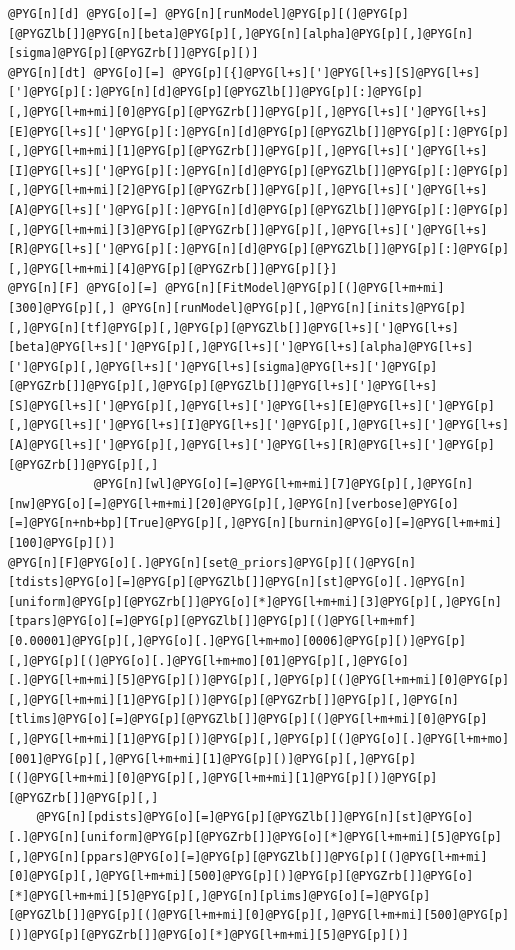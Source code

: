 \documentclass[a4paper,10pt,english]{manual}
\begin{document}
\begin{Verbatim}[commandchars=@\[\]]
@PYG[n][d] @PYG[o][=] @PYG[n][runModel]@PYG[p][(]@PYG[p][@PYGZlb[]]@PYG[n][beta]@PYG[p][,]@PYG[n][alpha]@PYG[p][,]@PYG[n][sigma]@PYG[p][@PYGZrb[]]@PYG[p][)]
@PYG[n][dt] @PYG[o][=] @PYG[p][{]@PYG[l+s][']@PYG[l+s][S]@PYG[l+s][']@PYG[p][:]@PYG[n][d]@PYG[p][@PYGZlb[]]@PYG[p][:]@PYG[p][,]@PYG[l+m+mi][0]@PYG[p][@PYGZrb[]]@PYG[p][,]@PYG[l+s][']@PYG[l+s][E]@PYG[l+s][']@PYG[p][:]@PYG[n][d]@PYG[p][@PYGZlb[]]@PYG[p][:]@PYG[p][,]@PYG[l+m+mi][1]@PYG[p][@PYGZrb[]]@PYG[p][,]@PYG[l+s][']@PYG[l+s][I]@PYG[l+s][']@PYG[p][:]@PYG[n][d]@PYG[p][@PYGZlb[]]@PYG[p][:]@PYG[p][,]@PYG[l+m+mi][2]@PYG[p][@PYGZrb[]]@PYG[p][,]@PYG[l+s][']@PYG[l+s][A]@PYG[l+s][']@PYG[p][:]@PYG[n][d]@PYG[p][@PYGZlb[]]@PYG[p][:]@PYG[p][,]@PYG[l+m+mi][3]@PYG[p][@PYGZrb[]]@PYG[p][,]@PYG[l+s][']@PYG[l+s][R]@PYG[l+s][']@PYG[p][:]@PYG[n][d]@PYG[p][@PYGZlb[]]@PYG[p][:]@PYG[p][,]@PYG[l+m+mi][4]@PYG[p][@PYGZrb[]]@PYG[p][}]
@PYG[n][F] @PYG[o][=] @PYG[n][FitModel]@PYG[p][(]@PYG[l+m+mi][300]@PYG[p][,] @PYG[n][runModel]@PYG[p][,]@PYG[n][inits]@PYG[p][,]@PYG[n][tf]@PYG[p][,]@PYG[p][@PYGZlb[]]@PYG[l+s][']@PYG[l+s][beta]@PYG[l+s][']@PYG[p][,]@PYG[l+s][']@PYG[l+s][alpha]@PYG[l+s][']@PYG[p][,]@PYG[l+s][']@PYG[l+s][sigma]@PYG[l+s][']@PYG[p][@PYGZrb[]]@PYG[p][,]@PYG[p][@PYGZlb[]]@PYG[l+s][']@PYG[l+s][S]@PYG[l+s][']@PYG[p][,]@PYG[l+s][']@PYG[l+s][E]@PYG[l+s][']@PYG[p][,]@PYG[l+s][']@PYG[l+s][I]@PYG[l+s][']@PYG[p][,]@PYG[l+s][']@PYG[l+s][A]@PYG[l+s][']@PYG[p][,]@PYG[l+s][']@PYG[l+s][R]@PYG[l+s][']@PYG[p][@PYGZrb[]]@PYG[p][,]
            @PYG[n][wl]@PYG[o][=]@PYG[l+m+mi][7]@PYG[p][,]@PYG[n][nw]@PYG[o][=]@PYG[l+m+mi][20]@PYG[p][,]@PYG[n][verbose]@PYG[o][=]@PYG[n+nb+bp][True]@PYG[p][,]@PYG[n][burnin]@PYG[o][=]@PYG[l+m+mi][100]@PYG[p][)]
@PYG[n][F]@PYG[o][.]@PYG[n][set@_priors]@PYG[p][(]@PYG[n][tdists]@PYG[o][=]@PYG[p][@PYGZlb[]]@PYG[n][st]@PYG[o][.]@PYG[n][uniform]@PYG[p][@PYGZrb[]]@PYG[o][*]@PYG[l+m+mi][3]@PYG[p][,]@PYG[n][tpars]@PYG[o][=]@PYG[p][@PYGZlb[]]@PYG[p][(]@PYG[l+m+mf][0.00001]@PYG[p][,]@PYG[o][.]@PYG[l+m+mo][0006]@PYG[p][)]@PYG[p][,]@PYG[p][(]@PYG[o][.]@PYG[l+m+mo][01]@PYG[p][,]@PYG[o][.]@PYG[l+m+mi][5]@PYG[p][)]@PYG[p][,]@PYG[p][(]@PYG[l+m+mi][0]@PYG[p][,]@PYG[l+m+mi][1]@PYG[p][)]@PYG[p][@PYGZrb[]]@PYG[p][,]@PYG[n][tlims]@PYG[o][=]@PYG[p][@PYGZlb[]]@PYG[p][(]@PYG[l+m+mi][0]@PYG[p][,]@PYG[l+m+mi][1]@PYG[p][)]@PYG[p][,]@PYG[p][(]@PYG[o][.]@PYG[l+m+mo][001]@PYG[p][,]@PYG[l+m+mi][1]@PYG[p][)]@PYG[p][,]@PYG[p][(]@PYG[l+m+mi][0]@PYG[p][,]@PYG[l+m+mi][1]@PYG[p][)]@PYG[p][@PYGZrb[]]@PYG[p][,]
    @PYG[n][pdists]@PYG[o][=]@PYG[p][@PYGZlb[]]@PYG[n][st]@PYG[o][.]@PYG[n][uniform]@PYG[p][@PYGZrb[]]@PYG[o][*]@PYG[l+m+mi][5]@PYG[p][,]@PYG[n][ppars]@PYG[o][=]@PYG[p][@PYGZlb[]]@PYG[p][(]@PYG[l+m+mi][0]@PYG[p][,]@PYG[l+m+mi][500]@PYG[p][)]@PYG[p][@PYGZrb[]]@PYG[o][*]@PYG[l+m+mi][5]@PYG[p][,]@PYG[n][plims]@PYG[o][=]@PYG[p][@PYGZlb[]]@PYG[p][(]@PYG[l+m+mi][0]@PYG[p][,]@PYG[l+m+mi][500]@PYG[p][)]@PYG[p][@PYGZrb[]]@PYG[o][*]@PYG[l+m+mi][5]@PYG[p][)]


\end{Verbatim}
\end{document}
